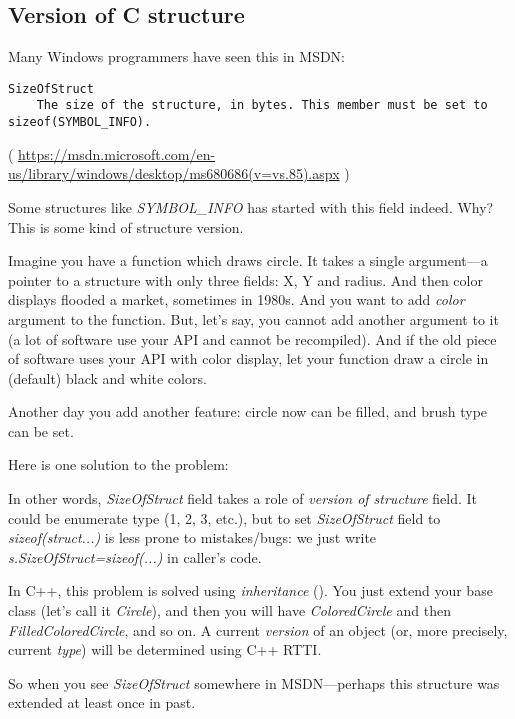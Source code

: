 \subsection{Version of C structure}

Many Windows programmers have seen this in MSDN:

\begin{lstlisting}
SizeOfStruct
    The size of the structure, in bytes. This member must be set to sizeof(SYMBOL_INFO).
\end{lstlisting}

( \url{https://msdn.microsoft.com/en-us/library/windows/desktop/ms680686(v=vs.85).aspx} )

Some structures like \emph{SYMBOL\_INFO} has started with this field indeed. Why?
This is some kind of structure version.

Imagine you have a function which draws circle.
It takes a single argument---a pointer to a structure with only three fields: X, Y and radius.
And then color displays flooded a market, sometimes in 1980s. And you want to add \emph{color} argument to the function.
But, let's say, you cannot add another argument to it (a lot of software use your \ac{API} and cannot be recompiled).
And if the old piece of software uses your \ac{API} with color display,
let your function draw a circle in (default) black and white colors.

Another day you add another feature: circle now can be filled, and brush type can be set.

Here is one solution to the problem:



In other words, \emph{SizeOfStruct} field takes a role of \emph{version of structure} field.
It could be enumerate type (1, 2, 3, etc.), but to set \emph{SizeOfStruct} field to \emph{sizeof(struct...)}
is less prone to mistakes/bugs: we just write \emph{s.SizeOfStruct=sizeof(...)} in caller's code.

In C++, this problem is solved using \emph{inheritance} ().
You just extend your base class (let's call it \emph{Circle}),
and then you will have \emph{ColoredCircle} and then \emph{FilledColoredCircle}, and so on.
A current \emph{version} of an object (or, more precisely, current \emph{type}) will be determined using C++ \ac{RTTI}.

So when you see \emph{SizeOfStruct} somewhere in \ac{MSDN}---perhaps this structure was extended at least once in past.

